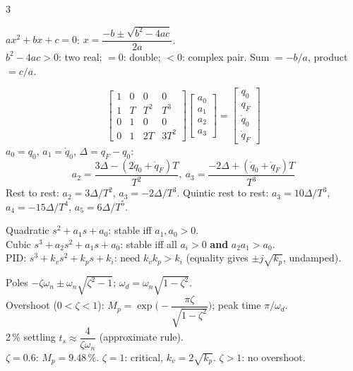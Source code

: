 \begin{multicols}{3}
\begin{fbx}[Quadratic]
$ax^2+bx+c=0$: $x=\dfrac{-b\pm\sqrt{b^2-4ac}}{2a}$.\\
$b^2-4ac>0$: two real; $=0$: double; $<0$: complex pair. Sum $=-b/a$, product $=c/a$.
\end{fbx}
\begin{fbx}
\[\begin{bmatrix}1&0&0&0\\1&T&T^2&T^3\\0&1&0&0\\0&1&2T&3T^2\end{bmatrix}\!\begin{bmatrix}a_0\\a_1\\a_2\\a_3\end{bmatrix}=\begin{bmatrix}q_0\\q_F\\\dot q_0\\\dot q_F\end{bmatrix}\]
$a_0=q_0$, $a_1=\dot q_0$, $\Delta=q_F-q_0$:
\[a_2=\frac{3\Delta-(2\dot q_0+\dot q_F)T}{T^2},\ a_3=\frac{-2\Delta+(\dot q_0+\dot q_F)T}{T^3}\]
Rest to rest: $a_2=3\Delta/T^2$, $a_3=-2\Delta/T^3$. Quintic rest to rest: $a_3=10\Delta/T^3$, $a_4=-15\Delta/T^4$, $a_5=6\Delta/T^5$.\chk
\end{fbx}
\begin{fbx}
Quadratic $s^2+a_1s+a_0$: stable iff $a_1,a_0>0$.\\
Cubic $s^3+a_2s^2+a_1s+a_0$: stable iff all $a_i>0$ \textbf{and} $a_2a_1>a_0$.\\
PID: $s^3+k_vs^2+k_ps+k_i$: need $k_vk_p>k_i$ (equality gives $\pm j\sqrt{k_p}$, undamped).
\end{fbx}
\begin{fbx}
Poles $-\zeta\omega_n\pm\omega_n\sqrt{\zeta^2-1}$; $\omega_d=\omega_n\sqrt{1-\zeta^2}$.\\
Overshoot ($0<\zeta<1$): $M_p=\exp\!\Big(\!-\dfrac{\pi\zeta}{\sqrt{1-\zeta^2}}\Big)$; peak time $\pi/\omega_d$.\\
2\,\% settling $t_s\approx\dfrac4{\zeta\omega_n}$ (approximate rule).\\
$\zeta=0.6$: $M_p=9.48\,\%$. $\zeta=1$: critical, $k_v=2\sqrt{k_p}$. $\zeta>1$: no overshoot.
\end{fbx}
\end{multicols}
